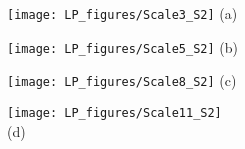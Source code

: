 \documentclass[]{article}
\begin{document}
\centering
\begin{minipage}{0.22\textwidth}
\centering
\texttt{[image: LP\_figures/Scale3\_S2]}
(a)
\end{minipage}
\begin{minipage}{0.22\textwidth}
\centering
\texttt{[image: LP\_figures/Scale5\_S2]}
(b)
\end{minipage}
\begin{minipage}{0.22\textwidth}
\centering
\texttt{[image: LP\_figures/Scale8\_S2]}
(c)
\end{minipage}
\begin{minipage}{0.22\textwidth}
\centering
\texttt{[image: LP\_figures/Scale11\_S2]}\\
(d)
\end{minipage}
\end{document}
